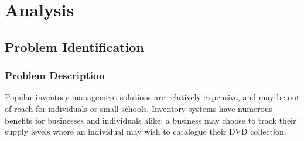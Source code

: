 \documentclass{article}
\title{\projectname}
\author{James Cahill}
\date{Sepetember 2023}
\begin{document}
\tableofcontents

\pagebreak

\section{Analysis}

\subsection{Problem Identification}

\subsubsection{Problem Description}

Popular inventory management solutions are relatively expensive, and may be out
of reach for individuals or small schools.
Inventory systems have numerous benefits for businesses and individuals alike; a business
may choose to track their supply levels where an individual may wish to catalogue their DVD collection. \\
\end{document}
